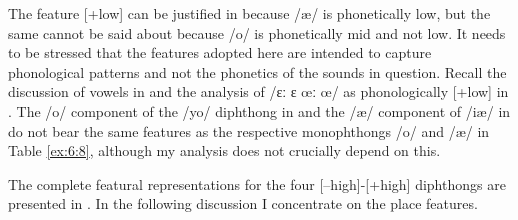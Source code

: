 The feature [+low] can be justified in  because /æ/ is phonetically low, but the same cannot be said about  because /o/ is phonetically mid and not low. It needs to be stressed that the features adopted here are intended to capture phonological patterns and not the phonetics of the sounds in question. Recall the discussion of vowels in  and the analysis of  /ɛː ɛ œː œ/ as phonologically [+low] in . The /o/ component of the /yo/ diphthong in  and the /æ/ component of /iæ/ in  do not bear the same features as the respective monophthongs /o/ and /æ/ in Table \ref{ex:6:8}, although my analysis does not crucially depend on this.

The complete featural representations for the four [--high]-[+high] diphthongs are presented in . In the following discussion I concentrate on the place features.


